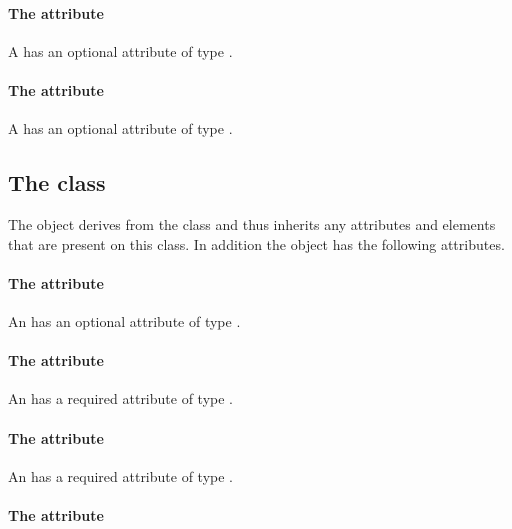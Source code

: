\paragraph{The \fixttspace{} attribute}

A \RenderGroup has an optional attribute  of type
\VTextAnchor.

\paragraph{The \fixttspace{} attribute}

A \RenderGroup has an optional attribute  of type
\RelAbsVector.

\subsection{The  class}
\label{image-class}


The \Image object derives from the  class and
thus inherits any attributes and elements that are present on this
class.
In addition the \Image object has the following attributes.

\paragraph{The \fixttspace{} attribute}

An \Image has an optional attribute  of type .

\paragraph{The \fixttspace{} attribute}

An \Image has a required attribute  of type \RelAbsVector.

\paragraph{The \fixttspace{} attribute}

An \Image has a required attribute  of type \RelAbsVector.

\paragraph{The \fixttspace{} attribute}

